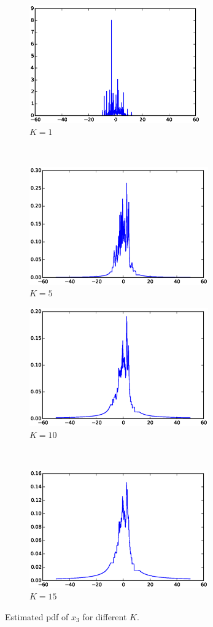\documentclass[a4paper,12pt]{article}
\begin{document}
\begin{figure}[h]
    \centering
    \begin{subfigure}[t]{0.5\textwidth} 
        \centering
        \includegraphics[height=2in]{figures/knn_x3_1.eps}
        \caption{$K=1$}
    \end{subfigure}%
    ~  %
    \begin{subfigure}[t]{0.5\textwidth}
        \centering
        \includegraphics[height=2in]{figures/knn_x3_5.eps}
        \caption{$K=5$}
    \end{subfigure}%

    \begin{subfigure}[t]{0.5\textwidth}
        \centering
        \includegraphics[height=2in]{figures/knn_x3_10.eps}
        \caption{$K=10$}
    \end{subfigure}%
    ~
    \begin{subfigure}[t]{0.5\textwidth}
        \centering
        \includegraphics[height=2in]{figures/knn_x3_15.eps}
        \caption{$K=15$}
    \end{subfigure}    
    \caption{Estimated pdf of $x_3$ for different $K$.}
\end{figure}
\end{document}
